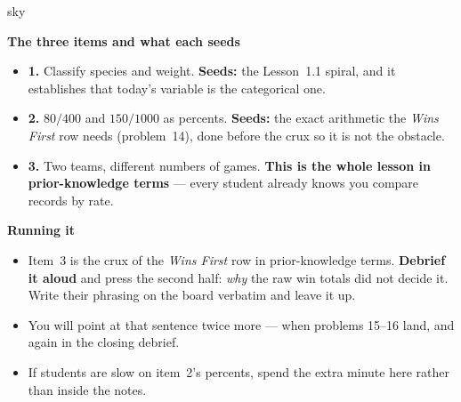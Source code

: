 \documentclass[10pt]{article}
\begin{document}
\boxguard[20]
\begin{skillbox}{sky}
\begin{minipage}[t]{0.48\linewidth}
    \textbf{The three items and what each seeds}
    \begin{itemize}
        \item \textbf{1.} Classify species and weight. \textbf{Seeds:} the Lesson~1.1 spiral,
              and it establishes that today's variable is the categorical one.
        \item \textbf{2.} $80/400$ and $150/1000$ as percents. \textbf{Seeds:} the exact
              arithmetic the \emph{Wins First} row needs (problem~14), done before the crux so
              it is not the obstacle.
        \item \textbf{3.} Two teams, different numbers of games. \textbf{This is the whole
              lesson in prior-knowledge terms} --- every student already knows you compare
              records by rate.
    \end{itemize}
\end{minipage}
\hfill
\begin{minipage}[t]{0.48\linewidth}
    \textbf{Running it}
    \begin{itemize}
        \item Item~3 is the crux of the \emph{Wins First} row in prior-knowledge terms.
              \textbf{Debrief it aloud} and press the second half: \emph{why} the raw win totals
              did not decide it. Write their phrasing on the board verbatim and leave it up.
        \item You will point at that sentence twice more --- when problems 15--16 land, and
              again in the closing debrief.
        \item If students are slow on item~2's percents, spend the extra minute here rather than
              inside the notes.
    \end{itemize}
\end{minipage}
\end{skillbox}
\end{document}
